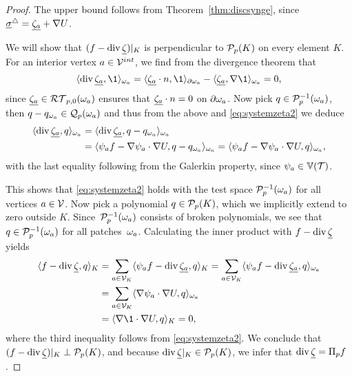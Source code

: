 \documentclass[thesis.tex]{subfiles}
\begin{document}
\begin{proof}
  The upper bound follows from Theorem~\ref{thm:discsynge}, since  $\vsig^\triangle = \vzeta + \nabla U$.

  We will show that $(f - \div \vzet)|_K$ is  perpendicular to $\P_p(K)$ on every element $K$.
  For an interior vertex $a \in \V^{int}$, we find from the divergence theorem that 
  \[
    \ip{\div \vzeta, \1}_{\w_a} =  \ip{\vzeta \cdot n, \1}_{\partial \w_a} - \ip{\vzeta, \nabla \1}_{\w_a} = 0,
  \]
  since $\vzeta \in \RT_{p,0}(\w_a)$ ensures that $\vzeta \cdot n = 0$ on $\partial \w_a$.
  Now pick $q \in \P_p^{-1}(\w_a)$, then $q - q_{\w_a} \in \QQ_p(\w_a)$ and thus from the above and \eqref{eq:systemzeta2} we deduce
  \begin{align*}
    \ip{\div \vzeta, q}_{\w_a} &= \ip{\div \vzeta,  q - q_{\w_a}}_{\w_a} \\
                               &= \ip{\psi_a f - \nabla \psi_a \cdot \nabla U, q - q_{\w_a}}_{\w_a} = \ip{\psi_a f - \nabla \psi_a \cdot \nabla U, q}_{\w_a},
\end{align*}
with the last equality following from the Galerkin property, since $\psi_a \in \VV(\T)$.

  This shows that \eqref{eq:systemzeta2} holds with the test space $\P_p^{-1}(\w_a)$ for all vertices $a \in \V$. 
  Now pick a polynomial $q \in \P_p(K)$,
  which we implicitly extend to zero outside $K$.  Since~$\P_p^{-1}(\w_a)$ consists of broken polynomials, we see that $q \in \P_p^{-1}(\w_a)$
  for all patches~$\w_a$. Calculating the inner product with $f - \div \vzet$ yields
  \begin{align*}
    \ip{f - \div \vzet, q}_K &= \sum_{a \in \V_K} \ip{ \psi_a f - \div \vzeta, q}_{K} = \sum_{a \in \V_K} \ip {\psi_a f - \div \vzeta, q}_{\w_a}\\
     &=\sum_{a \in \V_K} \ip{\nabla \psi_a \cdot \nabla U, q}_{\w_a}\\
    &= \ip{\nabla \1 \cdot \nabla U, q}_{K} = 0,
  \end{align*}
  where the third inequality follows from \eqref{eq:systemzeta2}. We conclude that  $(f - \div \vzet)|_K \perp \P_p(K)$, and because $\div \vzet|_K \in \P_p(K)$,
  we infer that $\div \vzet= \Pi_p f$.
\end{proof}


\end{document}
